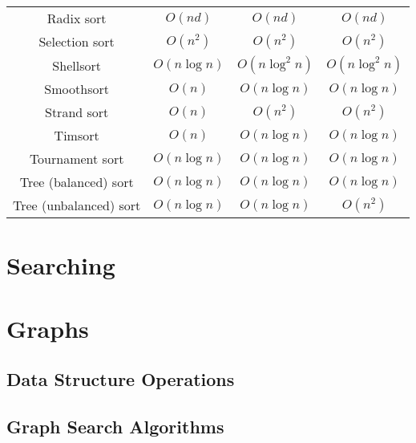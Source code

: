\documentclass{article}
\begin{document}
\begin{table}[ht]
\begin{tabular}{cccc}
		Radix sort\footnotemark[13] & $O(nd)$ & $O(nd)$ & $O(nd)$ \\
		Selection sort & $O(n^2)$ & $O(n^2)$ & $O(n^2)$\\
		Shellsort & $O(n \log{n})$& $O(n \log^2{n})$ & $O(n \log^2{n})$ \\
		Smoothsort & $O(n)$ & $O(n\log{n})$ & $O(n\log{n})$ \\
		Strand sort & $O(n)$ & $O(n^2)$ & $O(n^2)$ \\
		Timsort & $O(n)$ & $O(n\log{n})$ & $O(n\log{n})$ \\
		Tournament sort &$O(n\log{n})$ & $O(n\log{n})$ & $O(n\log{n})$ \\
		Tree (balanced) sort &$O(n\log{n})$ & $O(n\log{n})$ & $O(n\log{n})$ \\
		Tree (unbalanced) sort &$O(n\log{n})$ & $O(n\log{n})$ & $O(n^2)$ \\
		\hline
	\end{tabular}
\end{table}


\newpage
\section*{Searching}

\newpage
\section*{Graphs}
\subsection*{Data Structure Operations}

\newpage
\subsection*{Graph Search Algorithms}
\end{document}

